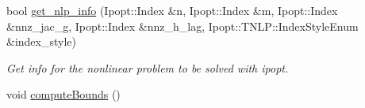 \begin{DoxyCompactItemize}
\item 
bool \hyperlink{classSuperQuadric__NLP_a2599f20c7a4c6eb3da7dec612098d1b4}{get\-\_\-nlp\-\_\-info} (Ipopt\-::\-Index \&n, Ipopt\-::\-Index \&m, Ipopt\-::\-Index \&nnz\-\_\-jac\-\_\-g, Ipopt\-::\-Index \&nnz\-\_\-h\-\_\-lag, Ipopt\-::\-T\-N\-L\-P\-::\-Index\-Style\-Enum \&index\-\_\-style)
\begin{DoxyCompactList}\small\item\em Get info for the nonlinear problem to be solved with ipopt. \end{DoxyCompactList}\item 
void \hyperlink{classSuperQuadric__NLP_aaafe8516b6f3e68caf218f6cfb048c1b}{compute\-Bounds} ()\label{classSuperQuadric__NLP_aaafe8516b6f3e68caf218f6cfb048c1b}


\end{DoxyCompactItemize}

